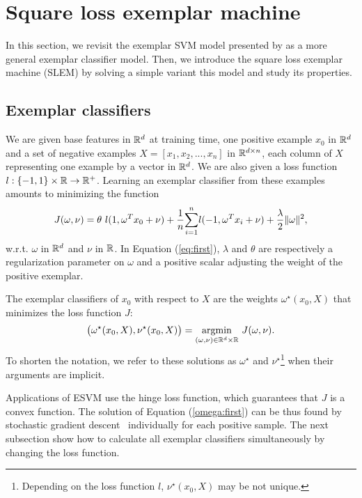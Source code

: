 \section{Square loss exemplar machine}\label{lsesvm}
In this section, we revisit the exemplar SVM model presented by \cite{Efros11} as a more general exemplar classifier model. Then, we introduce the square loss exemplar machine (SLEM) by solving a simple variant this model and study its properties.
\subsection{Exemplar classifiers} \label{esvm}
We are given base features in $\mathbb R^d$ at training time, one positive example $x_0$ in $\mathbb R^d$ and a set of negative examples $X = [x_1, x_2,...,x_n]$ in $\mathbb R^{d\times n}$, each column of $X$ representing one example by a vector in $\mathbb R^d$. 
We are also given a loss function $l:\{-1, 1\}\times \mathbb R\rightarrow\mathbb R^+$. Learning an exemplar classifier from these examples amounts to minimizing the function 
\begin{equation}
J(\omega, \nu) = \theta \ l(1, \omega^Tx_0+\nu) +\dfrac{1}{n}\displaystyle{\sum_{i=1}^n} l(-1, \omega^T x_i+\nu)+\dfrac{\lambda}{2}\|\omega\|^2, 
\label{eq:first}
\end{equation}
w.r.t. $\omega$ in $\mathbb R^d$ and $\nu$ in $\mathbb R$. In Equation (\ref{eq:first}), $\lambda$ and $\theta$ are respectively a regularization parameter on $\omega$ and a positive scalar adjusting the weight of the positive exemplar.

The exemplar classifiers of $x_0$ with respect to $X$ are the weights $\omega^\star(x_0,X)$ that minimizes the loss function $J$:
\begin{equation}
\big(\omega^\star(x_0, X), \nu^\star(x_0, X)\big) = \underset{(\omega,\nu)\in\mathbb R^d\times\mathbb R}{\operatorname*{argmin}} \ J(\omega, \nu). \label{omega:first}
\end{equation}
To shorten the notation, we refer to these solutions as $\omega^\star$ and $\nu^\star$\footnote{Depending on the loss function $l$, $\nu^\star(x_0,X)$ may be not unique.} when their arguments are implicit.

Applications of ESVM use the hinge loss function, which guarantees that $J$ is a convex function. The solution of Equation (\ref{omega:first}) can be thus found by stochastic gradient descent~\cite{bottou10} individually for each positive sample. The next subsection show how to calculate all exemplar classifiers simultaneously by changing the loss function.

